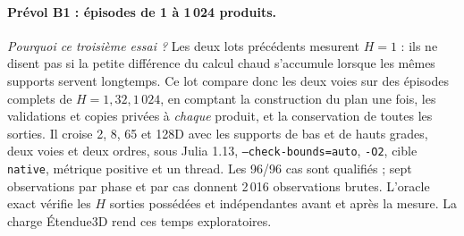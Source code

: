 \documentclass[11pt,a4paper]{article}
\newcommand{\code}[1]{\texttt{#1}}
\begin{document}
\paragraph{Prévol B1 : épisodes de 1 à 1\,024 produits.}
\emph{Pourquoi ce troisième essai ?} Les deux lots précédents mesurent
$H=1$ : ils ne disent pas si la petite différence du calcul chaud
s'accumule lorsque les mêmes supports servent longtemps. Ce lot compare
donc les deux voies sur des épisodes complets de $H=1,32,1\,024$, en
comptant la construction du plan une fois, les validations et copies
privées à \emph{chaque} produit, et la conservation de toutes les sorties.
Il croise 2, 8, 65 et 128D avec les supports de bas et de hauts grades,
deux voies et deux ordres, sous Julia 1.13, \code{--check-bounds=auto},
\code{-O2}, cible \code{native}, métrique positive et un thread. Les
96/96 cas sont qualifiés ; sept observations par phase et par cas donnent
2\,016 observations brutes. L'oracle exact vérifie les $H$ sorties
possédées et indépendantes avant et après la mesure. La charge Étendue3D
rend ces temps exploratoires.
\end{document}
